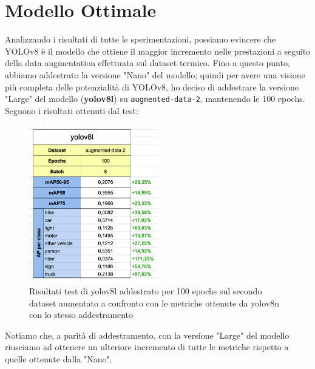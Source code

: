 \section{Modello Ottimale}
Analizzando i risultati di tutte le sperimentazioni, possiamo evincere che YOLOv8 è il modello che ottiene il maggior incremento nelle prestazioni a seguito della data augmentation effettuata sul dataset termico. Fino a questo punto, abbiamo addestrato la versione "Nano" del modello; quindi per avere una visione più completa delle potenzialità di YOLOv8, ho deciso di addestrare la versione "Large" del modello (\textbf{yolov8l}\cite{27}) su \texttt{augmented-data-2}, mantenendo le 100 epochs. Seguono i risultati ottenuti dal test:

\begin{figure}[ht]
    \centering
    \includegraphics[width=0.5\textwidth]{files/capitoli/4-sperimentazione-risultati/assets/yolov8l-metrics.png}
    \caption{\label{fig:yolov8l-metrics}Risultati test di yolov8l addestrato per 100 epochs sul secondo dataset aumentato a confronto con le metriche ottenute da yolov8n con lo stesso addestramento}
\end{figure}

Notiamo che, a parità di addestramento, con la versione "Large" del modello riusciamo ad ottenere un ulteriore incremento di tutte le metriche rispetto a quelle ottenute dalla "Nano".

\clearpage

